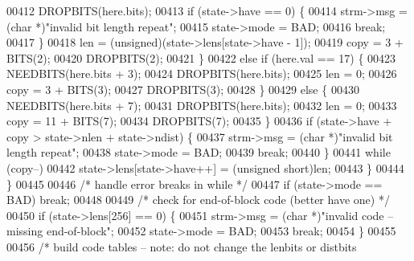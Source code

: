 \begin{DoxyCode}
{{{{00412                         DROPBITS(here.bits);
00413                         \textcolor{keywordflow}{if} (state->have == 0) \{
00414                             strm->msg = (\textcolor{keywordtype}{char} *)\textcolor{stringliteral}{"invalid bit length repeat"};
00415                             state->mode = BAD;
00416                             \textcolor{keywordflow}{break};
00417                         \}
00418                         len = (unsigned)(state->lens[state->have - 1]);
00419                         copy = 3 + BITS(2);
00420                         DROPBITS(2);
00421                     \}
00422                     \textcolor{keywordflow}{else} \textcolor{keywordflow}{if} (here.val == 17) \{
00423                         NEEDBITS(here.bits + 3);
00424                         DROPBITS(here.bits);
00425                         len = 0;
00426                         copy = 3 + BITS(3);
00427                         DROPBITS(3);
00428                     \}
00429                     \textcolor{keywordflow}{else} \{
00430                         NEEDBITS(here.bits + 7);
00431                         DROPBITS(here.bits);
00432                         len = 0;
00433                         copy = 11 + BITS(7);
00434                         DROPBITS(7);
00435                     \}
00436                     \textcolor{keywordflow}{if} (state->have + copy > state->nlen + state->ndist) \{
00437                         strm->msg = (\textcolor{keywordtype}{char} *)\textcolor{stringliteral}{"invalid bit length repeat"};
00438                         state->mode = BAD;
00439                         \textcolor{keywordflow}{break};
00440                     \}
00441                     \textcolor{keywordflow}{while} (copy--)
00442                         state->lens[state->have++] = (\textcolor{keywordtype}{unsigned} short)len;
00443                 \}
00444             \}
00445 
00446             \textcolor{comment}{/* handle error breaks in while */}
00447             \textcolor{keywordflow}{if} (state->mode == BAD) \textcolor{keywordflow}{break};
00448 
00449             \textcolor{comment}{/* check for end-of-block code (better have one) */}
00450             \textcolor{keywordflow}{if} (state->lens[256] == 0) \{
00451                 strm->msg = (\textcolor{keywordtype}{char} *)\textcolor{stringliteral}{"invalid code -- missing end-of-block"};
00452                 state->mode = BAD;
00453                 \textcolor{keywordflow}{break};
00454             \}
00455 
00456             \textcolor{comment}{/* build code tables -- note: do not change the lenbits or distbits}
}}}}
\end{DoxyCode}
